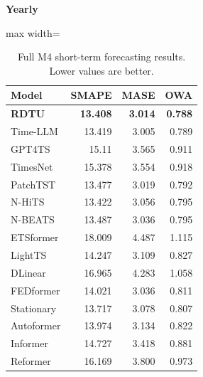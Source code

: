 \begin{table}[H]\centering\small
\caption{Full M4 short-term forecasting results. Lower values are better.}\label{tab:short-term-forecasting}
\textbf{Yearly}\par\smallskip
\begin{adjustbox}{max width=\linewidth}\begin{tabular}{lrrr}\toprule
\textbf{Model} & \textbf{SMAPE} & \textbf{MASE} & \textbf{OWA}\\\midrule
\rowcolor{blue!5}
\textbf{RDTU} & \textbf{13.408} & \textbf{3.014} & \textbf{0.788}\\
Time-LLM & 13.419 & 3.005 & 0.789\\
GPT4TS & 15.11 & 3.565 & 0.911\\
TimesNet & 15.378 & 3.554 & 0.918\\
PatchTST & 13.477 & 3.019 & 0.792\\
N-HiTS & 13.422 & 3.056 & 0.795\\
N-BEATS & 13.487 & 3.036 & 0.795\\
ETSformer & 18.009 & 4.487 & 1.115\\
LightTS & 14.247 & 3.109 & 0.827\\
DLinear & 16.965 & 4.283 & 1.058\\
FEDformer & 14.021 & 3.036 & 0.811\\
Stationary & 13.717 & 3.078 & 0.807\\
Autoformer & 13.974 & 3.134 & 0.822\\
Informer & 14.727 & 3.418 & 0.881\\
Reformer & 16.169 & 3.800 & 0.973\\
\bottomrule\end{tabular}\end{adjustbox}\end{table}
